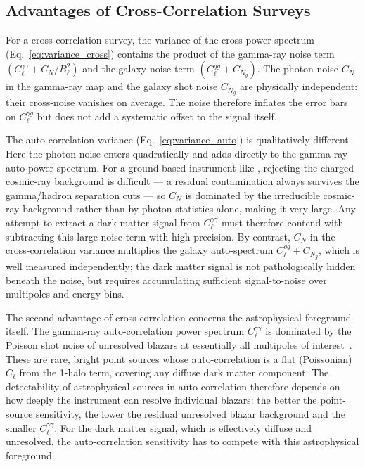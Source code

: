 \subsection{Advantages of Cross-Correlation Surveys}
\label{sec:8.2.2}
For a cross-correlation survey, the variance of the cross-power spectrum (Eq.~\ref{eq:variance_cross}) contains the product of the gamma-ray noise term $(C_\ell^{\gamma\gamma} + C_N/B_\ell^2)$ and the galaxy noise term $(C_\ell^{gg} + C_{N_g})$.
The photon noise $C_N$ in the gamma-ray map and the galaxy shot noise $C_{N_g}$ are physically independent: their cross-noise vanishes on average.
The noise therefore inflates the error bars on $C_\ell^{\gamma g}$ but does not add a systematic offset to the signal itself.

The auto-correlation variance (Eq.~\ref{eq:variance_auto}) is qualitatively different.
Here the photon noise enters quadratically and adds directly to the gamma-ray auto-power spectrum.
For a ground-based instrument like \CTAO, rejecting the charged cosmic-ray background is difficult --- a residual contamination always survives the gamma/hadron separation cuts --- so $C_N$ is dominated by the irreducible cosmic-ray background rather than by photon statistics alone, making it very large.
Any attempt to extract a dark matter signal from $C_\ell^{\gamma\gamma}$ must therefore contend with subtracting this large noise term with high precision.
By contrast, $C_N$ in the cross-correlation variance multiplies the galaxy auto-spectrum $C_\ell^{gg} + C_{N_g}$, which is well measured independently; the dark matter signal is not pathologically hidden beneath the noise, but requires accumulating sufficient signal-to-noise over multipoles and energy bins.

The second advantage of cross-correlation concerns the astrophysical foreground itself.
The gamma-ray auto-correlation power spectrum $C_\ell^{\gamma\gamma}$ is dominated by the Poisson shot noise of unresolved blazars at essentially all multipoles of interest~\cite{DGRB-review,Fornengo:2013rga}.
These are rare, bright point sources whose auto-correlation is a flat (Poissonian) $C_\ell$ from the 1-halo term, covering any diffuse dark matter component.
The detectability of astrophysical sources in auto-correlation therefore depends on how deeply the instrument can resolve individual blazars: the better the point-source sensitivity, the lower the residual unresolved blazar background and the smaller $C_\ell^{\gamma\gamma}$.
For the dark matter signal, which is effectively diffuse and unresolved, the auto-correlation sensitivity has to compete with this astrophysical foreground.

